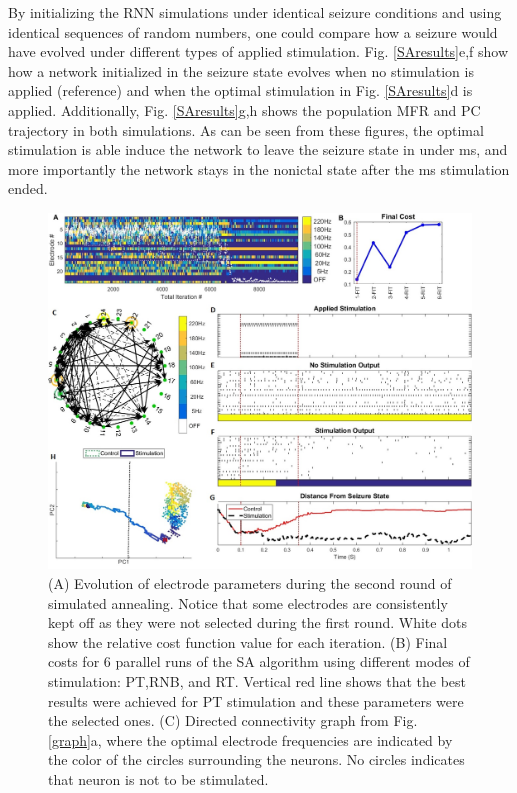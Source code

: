 \documentclass[11pt,a4paper,final]{article}
\begin{document}
By initializing the RNN simulations under identical seizure conditions and using identical sequences of random numbers, one could compare how a seizure would have evolved under different types of applied stimulation.
Fig. \ref{SAresults}e,f show how a network initialized in the seizure state evolves when no stimulation is applied (reference) and when the optimal stimulation in Fig. \ref{SAresults}d is applied.
Additionally, Fig. \ref{SAresults}g,h shows the population MFR and PC trajectory in both simulations.
As can be seen from these figures, the optimal stimulation is able induce the network to leave the seizure state in under \len{} ms, and more importantly the network stays in the nonictal state after the \len{} ms stimulation ended.

\begin{figure}[!ht]
	\centering
	\includegraphics[width=160mm]{SAresults}
	\caption[Simulated Annealing Results]{
		(A) Evolution of electrode parameters during the second round of simulated annealing. Notice that some electrodes are consistently kept off as they were not selected during the first round. White dots show the relative cost function value for each iteration.
		(B) Final costs for 6 parallel runs of the SA algorithm using different modes of stimulation: PT,RNB, and RT. Vertical red line shows that the best results were achieved for PT stimulation and these parameters were the selected ones.	
		(C) Directed connectivity graph from Fig. \ref{graph}a, where the optimal electrode frequencies are indicated by the color of the circles surrounding the neurons. No circles indicates that neuron is not to be stimulated.
}
\end{figure}
\end{document}
